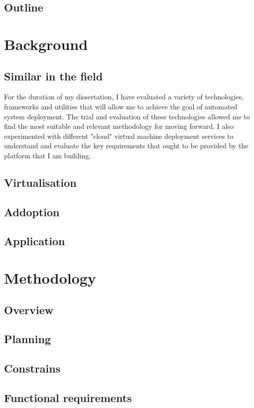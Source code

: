 \documentclass{article}
\begin{document}
  \subsection{Outline}

  \newpage
  \section{Background}
  \subsection{Similar in the field}
	For the duration of my dissertation, I have evaluated a variety of technologies, frameworks and utilities that will allow me to achieve the goal of automated system deployment. The trial and evaluation of these technologies allowed me to find the most suitable and relevant methodology for moving forward. I also experimented with different "cloud" virtual machine deployment services to understand and evaluate the key requirements that ought to be provided by the platform that I am building. 
  \subsection{Virtualisation}
  \subsection{Addoption}
  \subsection{Application}

  \newpage
  \section{Methodology}
  \subsection{Overview}
  \subsection{Planning}
  \subsection{Constrains}
  \subsection{Functional requirements}
\end{document}
